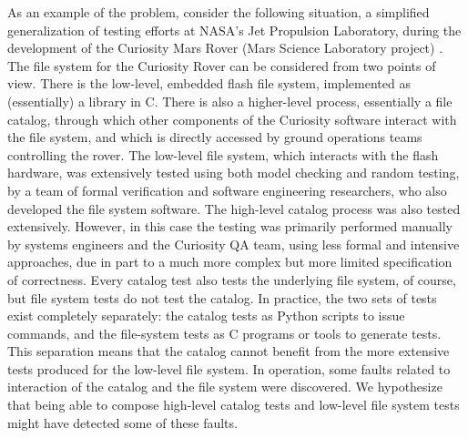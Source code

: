 As an example of the problem, consider the following situation, a simplified generalization of testing efforts at NASA's Jet Propulsion
Laboratory, during the development of the Curiosity Mars Rover (Mars
Science Laboratory project) \cite{CFV08,ICSEDiff,AMAI}.  The file
system for the Curiosity Rover can be considered from two points of
view.  There is the low-level, embedded flash file system, implemented
as (essentially) a library in C.  There is also a higher-level
process, essentially a file catalog, through which other components of
the Curiosity software interact with the file system, and which is
directly accessed by ground operations teams controlling the rover.
The low-level file system, which interacts with the flash hardware,
was extensively tested using both model checking and random testing,
by a team of formal verification and software engineering researchers,
who also developed the file system software.  The high-level catalog
process was also tested extensively.  However, in this case the
testing was primarily performed manually by systems engineers and the Curiosity
QA team, using less formal and intensive approaches, due in part to a much
more complex but more limited specification of correctness.  Every
catalog test also tests the underlying file system, of course, but file system
tests do not test the catalog.  In practice, the two sets of
tests exist completely separately: the catalog tests as 
Python scripts to issue commands, and the file-system tests as C
programs or tools to generate tests.  This separation means that the catalog cannot benefit from
the more extensive tests produced for the low-level file system.  In
operation, some faults related to interaction of the catalog and the
file system were discovered.  We hypothesize that being able to
compose high-level catalog tests and low-level file system tests
might have detected some of these faults.

